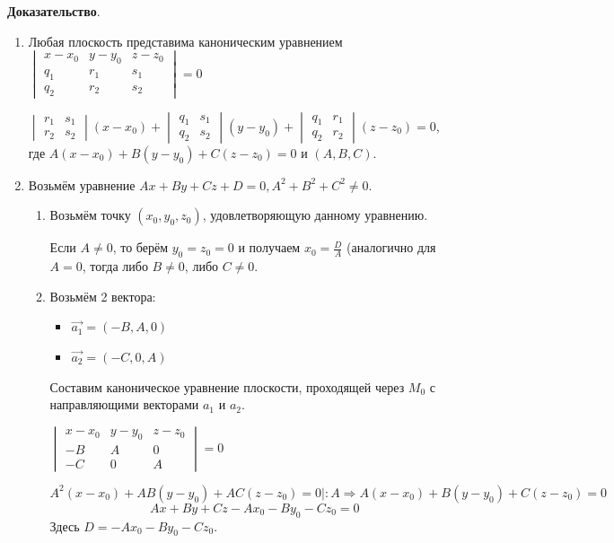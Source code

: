 \documentclass[a4paper]{article}
\begin{document}
\begin{hproof}
\textbf{Доказательство}. \begin{enumerate}
\item Любая плоскость представима каноническим уравнением $\begin{vmatrix}
	x-x_0& y-y_0& z-z_0\\
	q_1& r_1& s_1\\
	q_2& r_2& s_2
\end{vmatrix} = 0$\newline

$\begin{vmatrix}
	r_1& s_1\\
	r_2&s_2
\end{vmatrix}(x-x_0)+ \begin{vmatrix}
	q_1& s_1\\
	q_2&s_2
\end{vmatrix} (y-y_0)+ \begin{vmatrix}
	q_1& r_1\\
	q_2&r_2
\end{vmatrix} (z-z_0) = 0$, где $A(x-x_0)+B(y-y_0)+C(z-z_0) = 0$ и $(A,B,C)$.

\item Возьмём уравнение $Ax+By+Cz+D=0, A^2 + B^2 + C^2 \neq 0$.
\begin{enumerate}
\item Возьмём точку $(x_0, y_0, z_0)$, удовлетворяющую данному уравнению.

Если $A\neq 0$, то берём $y_0 = z_0 = 0$ и получаем $\displaystyle x_0 = \frac{D}{A}$ (аналогично для $A=0$, тогда либо $B \neq 0$, либо $C \neq 0$.

\item Возьмём 2 вектора: 

\begin{itemize}
\item $\vec{a_1} = (-B, A, 0)$
\item $\vec{a_2} = (-C, 0, A)$
\end{itemize}

Составим каноническое уравнение плоскости, проходящей через $M_0$ с направляющими векторами $a_1$ и $a_2$.

$\begin{vmatrix}
	x-x_0& y-y_0& z-z_0\\
	-B& A& 0\\
	-C& 0& A
\end{vmatrix} = 0$

\begin{equation}
A^2(x-x_0) + AB(y-y_0)+AC(z-z_0) = 0|:A \Rightarrow A(x-x_0) + B(y-y_0)+C(z-z_0) = 0 
\end{equation}
\begin{equation}
Ax+By+Cz - Ax_0 - By_0 -Cz_0 = 0
\end{equation}
Здесь $D = - Ax_0 - By_0 -Cz_0$.

\end{enumerate}
\end{enumerate}
\end{hproof}
\end{document}
